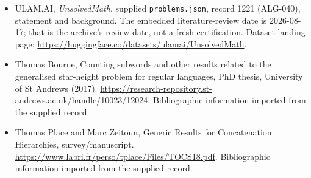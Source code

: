 \documentclass[11pt,a4paper]{article}
\begin{document}
{\small

\begin{itemize}

\item[\hypertarget{source:1221:1}{S1}] ULAM.AI, \emph{UnsolvedMath}, supplied \texttt{problems.json}, record 1221 (ALG-040), statement and background. The embedded literature-review date is 2026-08-17; that is the archive’s review date, not a fresh certification. Dataset landing page: \url{https://huggingface.co/datasets/ulamai/UnsolvedMath}.

\item[\hypertarget{source:1221:2}{S2}] Thomas Bourne, Counting subwords and other results related to the generalised star-height problem for regular languages, PhD thesis, University of St Andrews (2017). \url{https://research-repository.st-andrews.ac.uk/handle/10023/12024}. Bibliographic information imported from the supplied record.

\item[\hypertarget{source:1221:3}{S3}] Thomas Place and Marc Zeitoun, Generic Results for Concatenation Hierarchies, survey/manuscript. \url{https://www.labri.fr/perso/tplace/Files/TOCS18.pdf}. Bibliographic information imported from the supplied record.

\end{itemize}

}

\label{end:1221}
\end{document}
